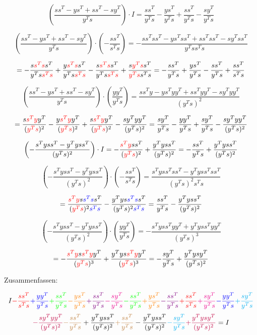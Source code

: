 \documentclass[a4paper, 12pt]{report}
\begin{document}
$$\left(\frac{ss^T - ys^T + ss^T - sy^T}{y^Ts}\right) \cdot I = \frac{ss^T}{y^Ts} - \frac{ys^T}{y^Ts} + \frac{ss^T}{y^Ts} - \frac{sy^T}{y^Ts}$$

$$\left(\frac{ss^T - ys^T + ss^T - sy^T}{y^Ts}\right)\cdot\left( - \frac{ss^T}{s^Ts} \right) = -\frac{ss^Tss^T - ys^Tss^T + ss^Tss^T - sy^Tss^T}{y^Tss^Ts}$$

$$= -\frac{s\textcolor{red}{s^Ts}s^T}{y^Ts\textcolor{red}{s^Ts}} + \frac{y\textcolor{red}{s^Ts}s^T}{y^Ts\textcolor{red}{s^Ts}} - \frac{s\textcolor{red}{s^Ts}s^T}{y^Ts\textcolor{red}{s^Ts}} + \frac{s\textcolor{red}{y^Ts}s^T}{\textcolor{red}{y^Ts}s^Ts} = -\frac{ss^T}{y^Ts} + \frac{ys^T}{y^Ts} - \frac{ss^T}{y^Ts} + \frac{ss^T}{s^Ts}$$

$$\left(\frac{ss^T - ys^T + ss^T - sy^T}{y^Ts}\right)\cdot \left( \frac{yy^T}{y^Ts} \right) = \frac{ss^Ty - ys^Tyy^T + ss^Tyy^T - sy^Tyy^T}{(y^Ts)^2}$$

$$= \frac{s\textcolor{red}{s^Ty}y^T}{(\textcolor{red}{y^Ts})^2} - \frac{y\textcolor{red}{s^Ty}y^T}{(\textcolor{red}{y^Ts})^2} + \frac{s\textcolor{red}{s^Ty}y^T}{(\textcolor{red}{y^Ts})^2}  - \frac{sy^Tyy^T}{(y^Ts)^2} = \frac{sy^T}{y^Ts} - \frac{yy^T}{y^Ts} + \frac{sy^T}{y^Ts} - \frac{sy^Tyy^T}{(y^Ts)^2} $$

$$ \left(-\frac{s^Tyss^T - y^Tyss^T}{(y^Ts)^2} \right)\cdot I = -\frac{\textcolor{red}{s^Ty}ss^T}{(\textcolor{red}{y^Ts})^2} + \frac{y^Tyss^T}{(y^Ts)^2} = -\frac{ss^T}{y^Ts} + \frac{y^Tyss^T}{(y^Ts)^2} $$

$$ \left(-\frac{s^Tyss^T - y^Tyss^T}{(y^Ts)^2} \right)\cdot \left( - \frac{ss^T}{s^Ts} \right) = \frac{s^Tyss^Tss^T - y^Tyss^Tss^T}{(y^Ts)^2s^Ts}$$

$$= \frac{\textcolor{red}{s^Ty}s\textcolor{blue}{s^Ts}s^T}{(\textcolor{red}{y^Ts})^2\textcolor{blue}{s^Ts}} - \frac{y^Tys\textcolor{blue}{s^Ts}s^T}{(y^Ts)^2\textcolor{blue}{s^Ts}} = \frac{ss^T}{y^Ts} - \frac{y^Tyss^T}{(y^Ts)^2}$$

$$ \left(-\frac{s^Tyss^T - y^Tyss^T}{(y^Ts)^2} \right)\cdot \left( \frac{yy^T}{y^Ts} \right) = -\frac{s^Tyss^Tyy^T + y^Tyss^Tyy^T}{(y^Ts)^3} $$

$$= -\frac{\textcolor{red}{s^Ty}s\textcolor{red}{s^Ty}y^T}{(\textcolor{red}{y^Ts})^3} + \frac{y^Tys\textcolor{red}{s^Ty}y^T}{(\textcolor{red}{y^Ts})^3} = -\frac{sy^T}{y^Ts} + \frac{y^Tysy^T}{(y^Ts)^2}$$

Zusammenfassen:

$$ I \textcolor{red}{-\frac{ss^T}{s^Ts}} \textcolor{blue}{+\frac{yy^T}{y^Ts}} \textcolor{green}{+\frac{ss^T}{y^Ts}} \textcolor{orange}{-\frac{ys^T}{y^Ts}} \textcolor{violet}{+\frac{ss^T}{y^Ts}} \textcolor{magenta}{-\frac{sy^T}{y^Ts}} \textcolor{green}{-\frac{ss^T}{y^Ts}} \textcolor{orange}{+\frac{ys^T}{y^Ts}} \textcolor{violet}{-\frac{ss^T}{y^Ts}} \textcolor{red}{+\frac{ss^T}{s^Ts}} \textcolor{magenta}{+\frac{sy^T}{y^Ts}} \textcolor{blue}{-\frac{yy^T}{y^Ts}} \textcolor{cyan}{+\frac{sy^T}{y^Ts}} $$
$$ \textcolor{purple}{-\frac{sy^Tyy^T}{(y^Ts)^2}} \textcolor{brown}{-\frac{ss^T}{y^Ts}} + \frac{y^Tyss^T}{(y^Ts)^2} \textcolor{brown}{+\frac{ss^T}{y^Ts}} - \frac{y^Tyss^T}{(y^Ts)^2} \textcolor{cyan}{-\frac{sy^T}{y^Ts}} \textcolor{purple}{+\frac{y^Tysy^T}{(y^Ts)^2}} = I $$
\end{document}

